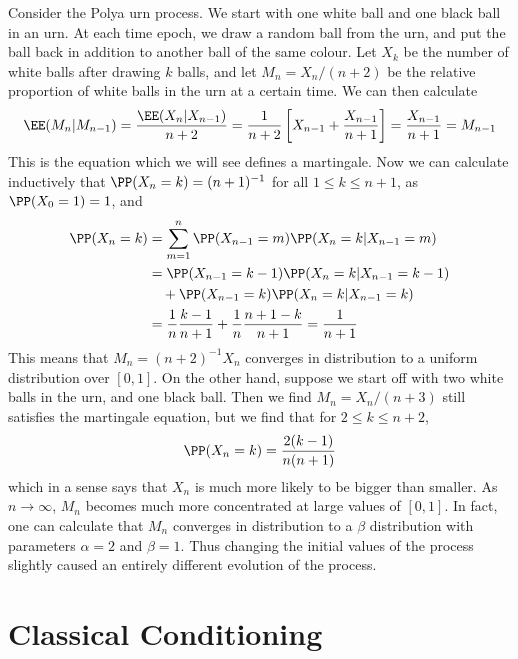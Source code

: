 \begin{example}
    Consider the Polya urn process. We start with one white ball and one black ball in an urn. At each time epoch, we draw a random ball from the urn, and put the ball back in addition to another ball of the same colour. Let $X_k$ be the number of white balls after drawing $k$ balls, and let $M_n = X_n / (n+2)$ be the relative proportion of white balls in the urn at a certain time. We can then calculate
    \[ \EE(M_n | M_{n-1}) = \frac{\EE(X_n | X_{n-1})}{n+2} = \frac{1}{n+2} \left[ X_{n-1} + \frac{X_{n-1}}{n+1} \right] = \frac{X_{n-1}}{n+1} = M_{n-1} \]
    This is the equation which we will see defines a martingale. Now we can calculate inductively that $\PP(X_n = k) = (n + 1)^{-1}$ for all $1 \leq k \leq n + 1$, as $\PP(X_0 = 1) = 1$, and
    \begin{align*}
        \PP(X_n = k) &= \sum_{m = 1}^n \PP(X_{n-1} = m) \PP(X_n = k | X_{n-1} = m) \\
        &= \PP(X_{n-1} = k-1) \PP(X_n = k | X_{n-1} = k-1)\\
        &\ \ \ + \PP(X_{n-1} = k) \PP(X_n = k | X_{n-1} = k)\\
        &= \frac{1}{n} \frac{k-1}{n+1} + \frac{1}{n} \frac{n + 1 - k}{n+1} = \frac{1}{n+1}
    \end{align*}
    This means that $M_n = (n+2)^{-1}X_n$ converges in distribution to a uniform distribution over $[0,1]$. On the other hand, suppose we start off with two white balls in the urn, and one black ball. Then we find $M_n = X_n/(n+3)$ still satisfies the martingale equation, but we find that for $2 \leq k \leq n + 2$,
    \[ \PP(X_n = k) = \frac{2(k-1)}{n(n+1)} \]
    which in a sense says that $X_n$ is much more likely to be bigger than smaller. As $n \to \infty$, $M_n$ becomes much more concentrated at large values of $[0,1]$. In fact, one can calculate that $M_n$ converges in distribution to a $\beta$ distribution with parameters $\alpha = 2$ and $\beta = 1$. Thus changing the initial values of the process slightly caused an entirely different evolution of the process.
\end{example}

\section{Classical Conditioning}

